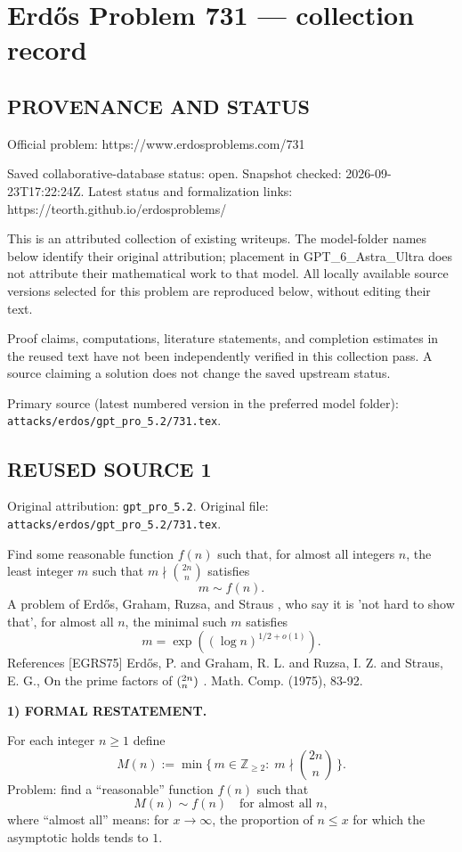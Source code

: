\section*{Erd\H{o}s Problem 731 --- collection record}

\subsection*{PROVENANCE AND STATUS}
Official problem: https://www.erdosproblems.com/731

Saved collaborative-database status: open.
Snapshot checked: 2026-09-23T17:22:24Z.
Latest status and formalization links: https://teorth.github.io/erdosproblems/

This is an attributed collection of existing writeups. The model-folder names below identify their original attribution; placement in GPT\_6\_Astra\_Ultra does not attribute their mathematical work to that model. All locally available source versions selected for this problem are reproduced below, without editing their text.

Proof claims, computations, literature statements, and completion estimates in the reused text have not been independently verified in this collection pass. A source claiming a solution does not change the saved upstream status.

Primary source (latest numbered version in the preferred model folder): \texttt{attacks/erdos/gpt\_pro\_5.2/731.tex}.

\subsection*{REUSED SOURCE 1}
Original attribution: \texttt{gpt\_pro\_5.2}.
Original file: \texttt{attacks/erdos/gpt\_pro\_5.2/731.tex}.


Find some reasonable function $f(n)$ such that, for almost all integers $n$, the least integer $m$ such that $m\nmid \binom{2n}{n}$ satisfies\[m\sim f(n).\] A problem of Erd\H{o}s, Graham, Ruzsa, and Straus \cite{EGRS75}, who say it is 'not hard to show that', for almost all $n$, the minimal such $m$ satisfies\[m=\exp((\log n)^{1/2+o(1)}).\] References [EGRS75] Erd\H{o}s, P. and Graham, R. L. and Ruzsa, I. Z. and Straus, E. G., On the prime factors of $(\sp{2n}\sb{n})$ . Math. Comp. (1975), 83-92.


\noindent\textbf{1) FORMAL RESTATEMENT.}

For each integer $n\ge 1$ define
\[
M(n):=\min\{\,m\in\mathbb Z_{\ge 2}:\; m\nmid \binom{2n}{n}\,\}.
\]
Problem: find a ``reasonable'' function $f(n)$ such that
\[
M(n)\sim f(n)\quad\text{for almost all }n,
\]
where ``almost all'' means: for $x\to\infty$, the proportion of $n\le x$ for which the asymptotic holds tends to $1$.

